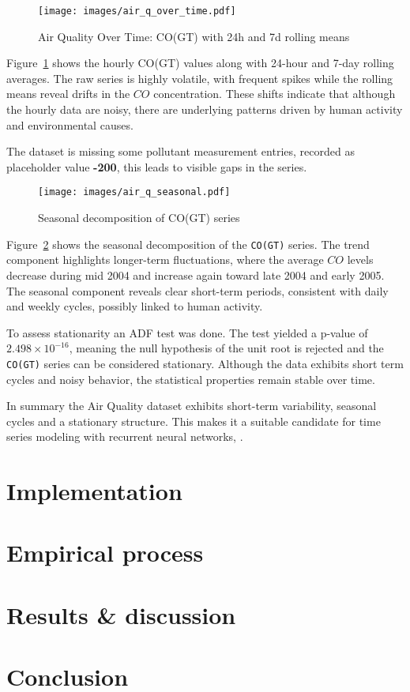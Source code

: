 \documentclass[conference]{IEEEtran}
\begin{document}
\begin{figure}[H]
\centering
\texttt{[image: images/air\_q\_over\_time.pdf]}
\caption{Air Quality Over Time: CO(GT) with 24h and 7d rolling means}
\label{fig:air_q_over_time}
\end{figure}

Figure~\ref{fig:air_q_over_time} shows the hourly CO(GT) values along with 24-hour and 7-day rolling averages. The raw series is highly volatile, with frequent spikes while the rolling means reveal drifts in the $CO$ concentration. These shifts indicate that although the hourly data are noisy, there are underlying patterns driven by human activity and environmental causes.

The dataset is missing some pollutant measurement entries, recorded as placeholder value \textbf{-200}, this leads to visible gaps in the series.

\begin{figure}[H]
\centering
\texttt{[image: images/air\_q\_seasonal.pdf]}
\caption{Seasonal decomposition of CO(GT) series}
\label{fig:air_q_seasonal}
\end{figure}

Figure~\ref{fig:air_q_seasonal} shows the seasonal decomposition of the \texttt{CO(GT)} series. The trend component highlights longer-term fluctuations, where the average $CO$ levels decrease during mid 2004 and increase again toward late 2004 and early 2005. The seasonal component reveals clear short-term periods, consistent with daily and weekly cycles, possibly linked to human activity.

To assess stationarity an ADF test was done. The test yielded a p-value of $2.498 \times 10^{-16}$, meaning the null hypothesis of the unit root is rejected and the \texttt{CO(GT)} series can be considered stationary. Although the data exhibits short term cycles and noisy behavior, the statistical properties remain stable over time.

In summary the Air Quality dataset exhibits short-term variability, seasonal cycles and a stationary structure. This makes it a suitable candidate for time series modeling with recurrent neural networks, \cite{air_quality}.

\section{\textbf{Implementation}}

\section{\textbf{Empirical process}}

\section{\textbf{Results \& discussion}}

\section{\textbf{Conclusion}}



\vspace{12pt}
\end{document}
